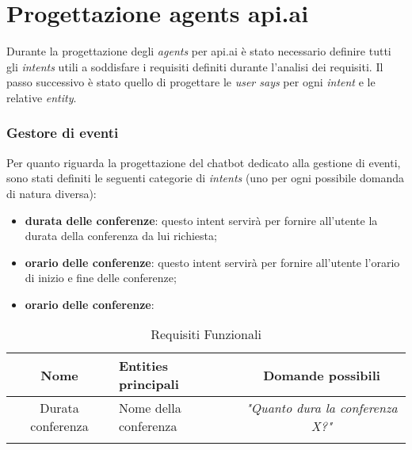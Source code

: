 \section{Progettazione agents api.ai}
Durante la progettazione degli \emph{agents} per api.ai è stato necessario definire tutti gli \emph{intents} utili a soddisfare i requisiti definiti durante l'analisi dei requisiti. Il passo successivo è stato quello di progettare le \emph{user says} per ogni \emph{intent} e le relative \emph{entity}.

\subsubsection{Gestore di eventi}
Per quanto riguarda la progettazione del \gls{chatbot} dedicato alla gestione di eventi, sono stati definiti le seguenti categorie di \emph{intents} (uno per ogni possibile domanda di natura diversa):
\begin{itemize}
	\item \textbf{durata delle conferenze}: questo intent servirà per fornire all'utente la durata della conferenza da lui richiesta;
	\item \textbf{orario delle conferenze}: questo intent servirà per fornire all'utente l'orario di inizio e fine delle conferenze;
	\item \textbf{orario delle conferenze}: 
\end{itemize}

\begin{center}
\begin{longtable}{|c|>{\centering}m{7cm}|c|}
\hline
\textbf{Nome} & \textbf{Entities principali} & \textbf{Domande possibili}\\
\hline
\endhead
Durata conferenza &  Nome della conferenza & \emph{"Quanto dura la conferenza X?"}\\ \hline
\caption[Requisiti Funzionali]{Requisiti Funzionali}
\label{tabella:req0}
\end{longtable}
\end{center}